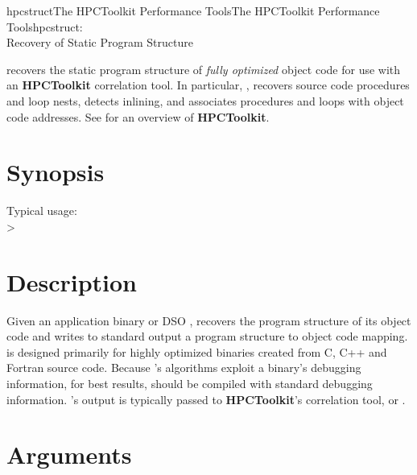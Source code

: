 \documentclass[english]{article}
\begin{document}
\begin{Name}{1}{hpcstruct}{The HPCToolkit Performance Tools}{The HPCToolkit Performance Tools}{hpcstruct:\\ Recovery of Static Program Structure}

 recovers the static program structure of \emph{fully optimized} object code for use with an \textbf{HPCToolkit} correlation tool.
In particular, , recovers source code procedures and loop nests, detects inlining, and associates procedures and loops with object code addresses.
See  for an overview of \textbf{HPCToolkit}.

\end{Name}

\section{Synopsis}

  

Typical usage:\\
  > 

\section{Description}

Given an application binary or DSO ,  recovers the program structure of its object code and writes to standard output a program structure to object code mapping.
 is designed primarily for highly optimized binaries created from C, C++ and Fortran source code.
Because 's algorithms exploit a binary's debugging information, for best results,  should be compiled with standard debugging information.
's output is typically passed to \textbf{HPCToolkit}'s correlation tool,  or .

\section{Arguments}
\end{document}
